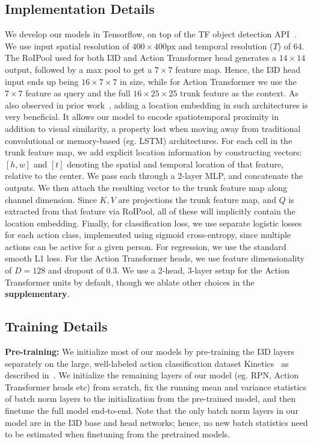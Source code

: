 \documentclass[10pt,twocolumn,letterpaper]{article}
\newcommand{\Tx}[0]{Action Transformer}
\newcommand{\st}[0]{spatiotemporal }
\begin{document}
\subsection{Implementation Details}\label{sec:app:impl}
We develop our models in Tensorflow, on top of the TF object detection
API~\cite{huang2017speed}. We use input spatial resolution of
$400\times 400$px and temporal resolution ($T$) of 64.  The RoIPool
used for both I3D and \Tx{} head generates a $14\times 14$ output,
followed by a max pool to get a $7\times 7$ feature map. Hence, the
I3D head input ends up being $16\times 7\times 7$ in size, while for
\Tx{} we use the $7\times 7$ feature as query and the full $16\times
25\times 25$ trunk feature as the context.  
As also observed in prior work~\cite{vaswani2017attention,parmar2018image},
adding a location embedding in such architectures is very beneficial.
It allows our model to encode \st{} proximity in addition
to visual similarity, a property lost when moving away from traditional convolutional
or memory-based (eg. LSTM) architectures.
For each cell in the trunk feature map, we add explicit location information by constructing
vectors: $[h, w]$ and $[t]$ denoting the spatial and temporal location
of that feature, relative to the center. 
We pass each through a 2-layer MLP, and concatenate
the outputs. We then attach the resulting vector to the trunk feature
map along channel dimension.  Since $K, V$
are projections the trunk feature map, and $Q$ is extracted from that
feature via RoIPool, all of these will implicitly contain the location
embedding.
Finally, for classification loss, we use separate logistic losses for each action
class, implemented using sigmoid cross-entropy, since multiple actions can be active
for a given person. For regression,
we use the standard smooth L1 loss.  For the \Tx{} heads, we use
feature dimensionality of $D=128$ and dropout of 0.3. We use a 2-head,
3-layer setup for the \Tx{} units by default, though we ablate other
choices in the {\bf supplementary}.

\subsection{Training Details}\label{sec:app:train}



{\noindent \bf Pre-training:} 
We initialize most of our models by
pre-training the I3D layers separately on the large,
well-labeled action classification dataset Kinetics~\cite{kay2017kinetics} as described in~\cite{carreira2017quo}.
We initialize the remaining layers of our model (eg. RPN, \Tx{} heads etc) from
scratch, fix the running mean and variance statistics of batch norm layers to
the initialization from the pre-trained model,
and then finetune the full model end-to-end.
Note that the only batch norm layers in our model are in the I3D base and head networks;
hence, no new batch statistics need to be estimated when finetuning from the pretrained models.
\end{document}
